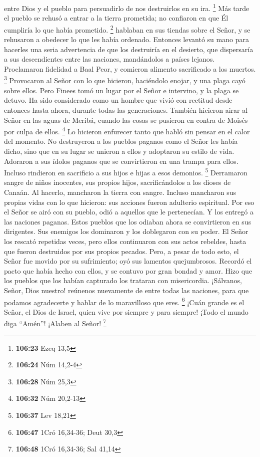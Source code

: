 entre Dios y el pueblo para persuadirlo de nos destruirlos en su ira.
\footnote{\textbf{106:23} Ezeq 13,5}  Más tarde el pueblo
se rehusó a entrar a la tierra prometida; no confiaron en que Él
cumpliría lo que había prometido. \footnote{\textbf{106:24} Núm 14,2-4}
 hablaban en sus tiendas sobre el Señor, y se rehusaron a
obedecer lo que les había ordenado.  Entonces levantó su
mano para hacerles una seria advertencia de que los destruiría en el
desierto,  que dispersaría a sus descendientes entre las
naciones, mandándolos a países lejanos.  Proclamaron
fidelidad a Baal Peor, y comieron alimento sacrificado a los muertos.
\footnote{\textbf{106:28} Núm 25,3}  Provocaron al Señor
con lo que hicieron, haciéndolo enojar, y una plaga cayó sobre ellos.
 Pero Finees tomó un lugar por el Señor e intervino, y la
plaga se detuvo.  Ha sido considerado como un hombre que
vivió con rectitud desde entonces hasta ahora, durante todas las
generaciones.  También hicieron airar al Señor en las aguas
de Meribá, cuando las cosas se pusieron en contra de Moisés por culpa de
ellos. \footnote{\textbf{106:32} Núm 20,2-13}  Lo hicieron
enfurecer tanto que habló sin pensar en el calor del momento.
 No destruyeron a los pueblos paganos como el Señor les
había dicho,  sino que en su lugar se unieron a ellos y
adoptaron su estilo de vida.  Adoraron a sus ídolos paganos
que se convirtieron en una trampa para ellos.  Incluso
rindieron en sacrificio a sus hijos e hijas a esos demonios. \footnote{\textbf{106:37}
  Lev 18,21}  Derramaron sangre de niños inocentes, sus
propios hijos, sacrificándolos a los dioses de Canaán. Al hacerlo,
mancharon la tierra con sangre.  Incluso mancharon sus
propias vidas con lo que hicieron: sus acciones fueron adulterio
espiritual.  Por eso el Señor se airó con su pueblo, odió a
aquellos que le pertenecían.  Y los entregó a las naciones
paganas. Estos pueblos que los odiaban ahora se convirtieron en sus
dirigentes.  Sus enemigos los dominaron y los doblegaron
con su poder.  El Señor los rescató repetidas veces, pero
ellos continuaron con sus actos rebeldes, hasta que fueron destruidos
por sus propios pecados.  Pero, a pesar de todo esto, el
Señor fue movido por su sufrimiento; oyó sus lamentos quejumbrosos.
 Recordó el pacto que había hecho con ellos, y se contuvo
por gran bondad y amor.  Hizo que los pueblos que los
habían capturado los trataran con misericordia.  ¡Sálvanos,
Señor, Dios nuestro! reúnenos nuevamente de entre todas las naciones,
para que podamos agradecerte y hablar de lo maravilloso que eres.
\footnote{\textbf{106:47} 1Cró 16,34-36; Deut 30,3}  ¡Cuán
grande es el Señor, el Dios de Israel, quien vive por siempre y para
siempre! ¡Todo el mundo diga ``Amén''! ¡Alaben al Señor! \footnote{\textbf{106:48}
  1Cró 16,34-36; Sal 41,14}

